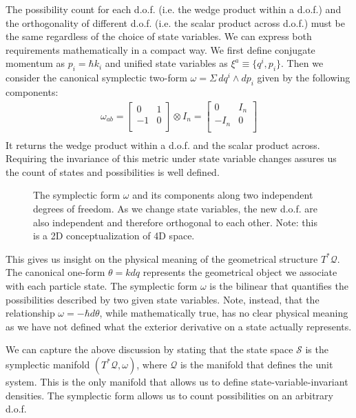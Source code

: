 \documentclass[smallextended]{svjour3}
\numberwithin{equation}{section}
\theoremstyle{definition}
\begin{document}
The possibility count for each d.o.f. (i.e. the wedge product within a d.o.f.) and the orthogonality of different d.o.f. (i.e. the scalar product across d.o.f.) must be the same regardless of the choice of state variables. We can express both requirements mathematically in a compact way. We first define conjugate momentum as $p_i=\hbar k_i$ and unified state variables as $\xi^a\equiv \{q^i, p_i\}$. Then we consider the canonical symplectic two-form $\omega =\Sigma \, dq^i \wedge dp_i$ given by the following components:
\begin{align*}
\omega_{ab} =  \left[
\begin{array}{cc}
0 & 1 \\
-1 & 0 \\
\end{array}
\right] \otimes I_n =
\left[
\begin{array}{cc}
0 & I_n \\
-I_n & 0 \\
\end{array}
\right] \\
\end{align*}
It returns the wedge product within a d.o.f. and the scalar product across. Requiring the invariance of this metric under state variable changes assures us the count of states and possibilities is well defined.

\begin{figure}
	
	\caption{The symplectic form $\omega$ and its components along two independent degrees of freedom. As we change state variables, the new d.o.f. are also independent and therefore orthogonal to each other. Note: this is a 2D conceptualization of 4D space.}
	\label{fig:independent_dof}
\end{figure}

This gives us insight on the physical meaning of the geometrical structure $T^*\mathcal{Q}$. The canonical one-form $\theta=k dq$ represents the geometrical object we associate with each particle state. The symplectic form $\omega$ is the bilinear that quantifies the possibilities described by two given state variables. Note, instead, that the relationship $\omega = - \hbar d\theta$, while mathematically true, has no clear physical meaning as we have not defined what the exterior derivative on a state actually represents.

We can capture the above discussion by stating that the state space $\mathcal{S}$ is the symplectic manifold $(T^*\mathcal{Q}, \omega)$, where $\mathcal{Q}$ is the manifold that defines the unit system. This is the only manifold that allows us to define state-variable-invariant densities. The symplectic form allows us to count possibilities on an arbitrary d.o.f. 
\end{document}

